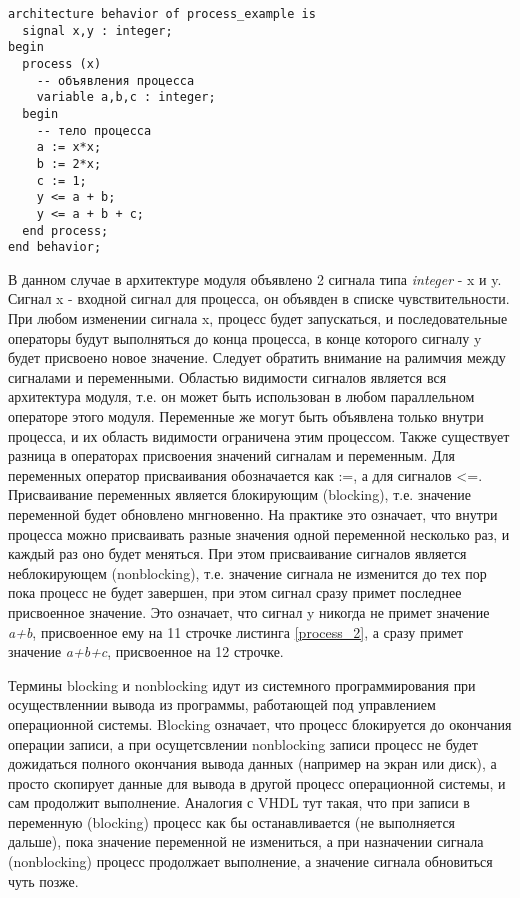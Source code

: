 \begin{Code}
\begin{lstlisting}[caption=Процесс с внутренними переменными и списком чувствительности, label=process_2]
architecture behavior of process_example is
  signal x,y : integer;
begin
  process (x)
    -- объявления процесса
    variable a,b,c : integer;
  begin
    -- тело процесса
    a := x*x;
    b := 2*x;
    c := 1;
    y <= a + b;
    y <= a + b + c;
  end process;
end behavior;
\end{lstlisting}
\end{Code}

В данном случае в архитектуре модуля объявлено 2 сигнала типа \emph{integer} - x и y. Сигнал x - входной сигнал для процесса, он объявден в списке чувствительности. При любом изменении сигнала x, процесс будет запускаться, и последовательные операторы будут выполняться до конца процесса, в конце которого сигналу y будет присвоено новое значение. Следует обратить внимание на ралимчия между сигналами и переменными. Областью видимости сигналов является вся архитектура модуля, т.е. он может быть использован в любом параллельном операторе этого модуля. Переменные же могут быть объявлена только внутри процесса, и их область видимости ограничена этим процессом. Также существует разница в операторах присвоения значений сигналам и переменным. Для переменных оператор присваивания обозначается как :=, а для сигналов <=. Присваивание переменных является блокирующим (blocking), т.е. значение переменной будет обновлено мнгновенно. На практике это означает, что внутри процесса можно присваивать разные значения одной переменной несколько раз, и каждый раз оно будет меняться. При этом присваивание сигналов является неблокирующем (nonblocking), т.е. значение сигнала не изменится до тех пор пока процесс не будет завершен, при этом сигнал сразу примет последнее присвоенное значение. Это означает, что сигнал y никогда не примет значение \emph{a+b}, присвоенное ему на 11 строчке листинга \ref{process_2}, а сразу примет значение \emph{a+b+c}, присвоенное на 12 строчке.

Термины blocking и nonblocking идут из системного программирования при осуществленнии вывода из программы, работающей под управлением операционной системы. Blocking означает, что процесс блокируется до окончания операции записи, а при осущетсвлении nonblocking записи процесс не будет дожидаться полного окончания вывода данных (например на экран или диск), а просто скопирует данные для вывода в другой процесс операционной системы, и сам продолжит выполнение. Аналогия с VHDL тут такая, что при записи в переменную (blocking) процесс как бы останавливается (не выполняется дальше), пока значение переменной не измениться, а при назначении сигнала (nonblocking) процесс продолжает выполнение, а значение сигнала обновиться чуть позже.

